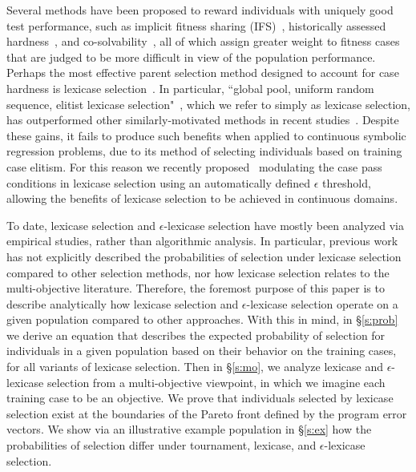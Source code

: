 \documentclass[twoside]{article}
\begin{document}
Several methods have been proposed to reward individuals with uniquely good test performance, such as implicit fitness sharing (IFS)~\citep{mckay_investigation_2001}, historically assessed hardness~\citep{klein_genetic_2008}, and co-solvability~\citep{schaefer_using_2010}, all of which assign greater weight to fitness cases that are judged to be more difficult in view of the population performance. Perhaps the most effective parent selection method designed to account for case hardness is lexicase selection~\citep{spector_assessment_2012}. In particular, ``global  pool,  uniform  random  sequence,  elitist  lexicase  selection"~\citep{spector_assessment_2012}, which we refer to simply as lexicase selection, has outperformed other similarly-motivated methods in recent studies~\citep{helmuth_solving_2014, helmuth_general_2015-1, liskowski_comparison_2015}. Despite these gains, it fails to produce such benefits when applied to continuous symbolic regression problems, due to its method of selecting individuals based on training case elitism. For this reason we recently proposed~\citep{la_cava_epsilon-lexicase_2016} modulating the case pass conditions in lexicase selection using an automatically defined $\epsilon$ threshold, allowing the benefits of lexicase selection to be achieved in continuous domains. 

To date, lexicase selection and $\epsilon$-lexicase selection have mostly been analyzed via empirical studies, rather than algorithmic analysis. In particular, previous work has not explicitly described the probabilities of selection under lexicase selection compared to other selection methods, nor how lexicase selection relates to the multi-objective literature. Therefore, the foremost purpose of this paper is to describe analytically how lexicase selection and $\epsilon$-lexicase selection operate on a given population compared to other approaches. With this in mind, in \S\ref{s:prob} we derive an equation that describes the expected probability of selection for individuals in a given population based on their behavior on the training cases, for all variants of lexicase selection. Then in \S\ref{s:mo}, we analyze lexicase and $\epsilon$-lexicase selection from a multi-objective viewpoint, in which we imagine each training case to be an objective. We prove that individuals selected by lexicase selection exist at the boundaries of the Pareto front defined by the program error vectors. We show via an illustrative example population in \S\ref{s:ex} how the probabilities of selection differ under tournament, lexicase, and $\epsilon$-lexicase selection. 
\end{document}

